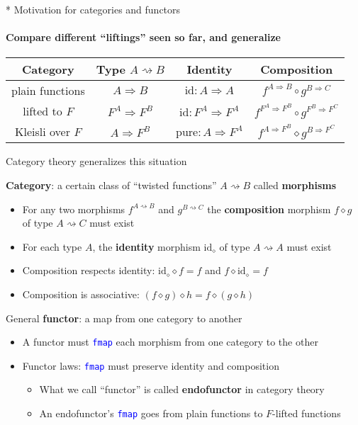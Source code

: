 \documentclass[english]{beamer}
\providecommand{\tabularnewline}{\\}
\begin{document}
\begin{frame}{{*} Motivation for categories and functors}

\framesubtitle{Compare different ``liftings'' seen so far, and generalize}
\begin{center}
\vspace{-0.25cm}%
\begin{tabular}{|c|c|c|c|}
\hline 
\textbf{Category} &
\textbf{Type }$A\rightsquigarrow B$ &
\textbf{Identity} &
\textbf{Composition}\tabularnewline
\hline 
\hline 
plain functions &
$A\Rightarrow B$ &
$\text{id}:A\Rightarrow A$ &
$f^{A\Rightarrow B}\circ g^{B\Rightarrow C}$\tabularnewline
\hline 
lifted to $F$ &
$F^{A}\Rightarrow F^{B}$ &
$\text{id}:F^{A}\Rightarrow F^{A}$ &
$f^{F^{A}\Rightarrow F^{B}}\circ g^{F^{B}\Rightarrow F^{C}}$\tabularnewline
\hline 
Kleisli over $F$ &
$A\Rightarrow F^{B}$ &
$\text{pure}:A\Rightarrow F^{A}$ &
$f^{A\Rightarrow F^{B}}\diamond g^{B\Rightarrow F^{C}}$\tabularnewline
\hline 
\end{tabular}
\par\end{center}

\vspace{-0.15cm}Category theory generalizes this situation

\textbf{Category}: a certain class of ``twisted functions'' $A\rightsquigarrow B$
called \textbf{morphisms}
\begin{itemize}
\item For any two morphisms $f^{A\rightsquigarrow B}$ and $g^{B\rightsquigarrow C}$
the \textbf{composition} morphism $f\diamond g$ of type $A\rightsquigarrow C$
must exist
\item For each type $A$, the \textbf{identity} morphism $\text{id}_{\diamond}$
of type $A\rightsquigarrow A$ must exist
\item Composition respects identity: $\text{id}_{\diamond}\diamond f=f$
and $f\diamond\text{id}_{\diamond}=f$
\item Composition is associative: $\left(f\diamond g\right)\diamond h=f\diamond\left(g\diamond h\right)$
\end{itemize}
General \textbf{functor}: a map from one category to another
\begin{itemize}
\item A functor must \texttt{\textcolor{blue}{\footnotesize{}fmap}} each
morphism from one category to the other
\item Functor laws: \texttt{\textcolor{blue}{\footnotesize{}fmap}} must
preserve identity and composition
\begin{itemize}
\item What we call ``functor'' is called \textbf{endofunctor} in category
theory
\item An endofunctor's \texttt{\textcolor{blue}{\footnotesize{}fmap}} goes
from plain functions to $F$-lifted functions
\end{itemize}
\end{itemize}
\end{frame}
\end{document}

